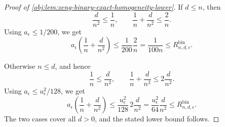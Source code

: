 \begin{proof}[Proof of \cref{obj:lem:zeng-binary-exact-homogeneity-lower}]
If \(d\le n\), then
\[
\frac{d}{n^2}\le \frac1n,
\qquad
\frac1n+\frac{d}{n^2}\le \frac2n .
\]
Using \(a_\epsilon\le1/200\), we get
\[
a_\epsilon\left(\frac1n+\frac{d}{n^2}\right)
\le
\frac1{200}\frac2n
=
\frac1{100n}
\le
R_{n,d,\epsilon}^{\mathrm{bin}} .
\]

Otherwise \(n\le d\), and hence
\[
\frac1n\le \frac{d}{n^2},
\qquad
\frac1n+\frac{d}{n^2}\le 2\frac{d}{n^2}.
\]
Using \(a_\epsilon\le u_\epsilon^2/128\), we get
\[
a_\epsilon\left(\frac1n+\frac{d}{n^2}\right)
\le
\frac{u_\epsilon^2}{128}\,2\frac{d}{n^2}
=
\frac{u_\epsilon^2}{64}\frac{d}{n^2}
\le
R_{n,d,\epsilon}^{\mathrm{bin}} .
\]
The two cases cover all \(d>0\), and the stated lower bound follows.
\end{proof}
